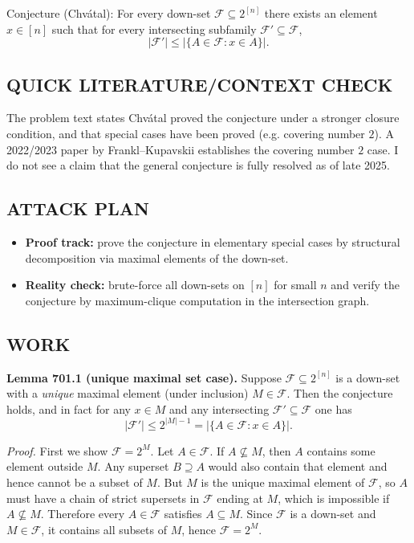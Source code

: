 Conjecture (Chv\'{a}tal): For every down-set $\mathcal{F}\subseteq 2^{[n]}$ there exists an element $x\in [n]$ such that for every intersecting subfamily $\mathcal{F}'\subseteq\mathcal{F}$,
\[|\mathcal{F}'|\le |\{A\in\mathcal{F}: x\in A\}|.
\]

\subsection*{QUICK LITERATURE/CONTEXT CHECK}
The problem text states Chv\'{a}tal proved the conjecture under a stronger closure condition, and that special cases have been proved (e.g. covering number $2$). A 2022/2023 paper by Frankl--Kupavskii establishes the covering number $2$ case.
I do not see a claim that the general conjecture is fully resolved as of late 2025.

\subsection*{ATTACK PLAN}
\begin{itemize}
\item \textbf{Proof track:} prove the conjecture in elementary special cases by structural decomposition via maximal elements of the down-set.
\item \textbf{Reality check:} brute-force all down-sets on $[n]$ for small $n$ and verify the conjecture by maximum-clique computation in the intersection graph.
\end{itemize}

\subsection*{WORK}
\textbf{Lemma 701.1 (unique maximal set case).}
Suppose $\mathcal{F}\subseteq 2^{[n]}$ is a down-set with a \emph{unique} maximal element (under inclusion) $M\in\mathcal{F}$. Then the conjecture holds, and in fact for any $x\in M$ and any intersecting $\mathcal{F}'\subseteq\mathcal{F}$ one has
\[|\mathcal{F}'|\le 2^{|M|-1}=|\{A\in\mathcal{F}: x\in A\}|.
\]

\emph{Proof.}
First we show $\mathcal{F}=2^{M}$. Let $A\in\mathcal{F}$. If $A\nsubseteq M$, then $A$ contains some element outside $M$. Any superset $B\supseteq A$ would also contain that element and hence cannot be a subset of $M$. But $M$ is the unique maximal element of $\mathcal{F}$, so $A$ must have a chain of strict supersets in $\mathcal{F}$ ending at $M$, which is impossible if $A\nsubseteq M$. Therefore every $A\in\mathcal{F}$ satisfies $A\subseteq M$. Since $\mathcal{F}$ is a down-set and $M\in\mathcal{F}$, it contains all subsets of $M$, hence $\mathcal{F}=2^{M}$.

